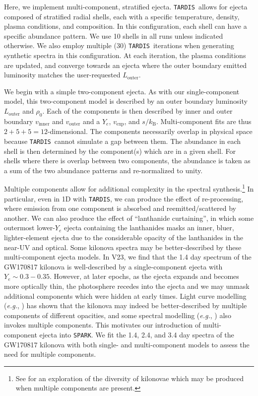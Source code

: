 \documentclass[twocolumn, twocolappendix]{aastex63}
\def\SPARK{\texttt{SPARK}}
\def\TARDIS{\texttt{TARDIS}}
\def\eg{{\it e.g.}}
\begin{document}
Here, we implement multi-component, stratified ejecta. \TARDIS~allows for ejecta composed of stratified radial shells, each with a specific temperature, density, plasma conditions, and composition. In this configuration, each shell can have a specific abundance pattern. We use 10 shells in all runs unless indicated otherwise. We also employ multiple (30) \TARDIS~iterations when generating synthetic spectra in this configuration. At each iteration, the plasma conditions are updated, and converge towards an ejecta where the outer boundary emitted luminosity matches the user-requested $L_{\mathrm{outer}}$. 
    
We begin with a simple two-component ejecta. As with our single-component model, this two-component model is described by an outer boundary luminosity $L_{\mathrm{outer}}$ and $\rho_0$. Each of the components is then described by inner and outer boundary $v_{\mathrm{inner}}$ and $v_{\mathrm{outer}}$ and a $Y_e$, $v_{\mathrm{exp}}$, and $s / k_{\mathrm{B}}$. Multi-component fits are thus $2 + 5 + 5 = 12$-dimensional. The components necessarily overlap in physical space because \TARDIS~cannot simulate a gap between them. The abundance in each shell is then determined by the component(s) which are in a given shell. For shells where there is overlap between two components, the abundance is taken as a sum of the two abundance patterns and re-normalized to unity. %
    
Multiple components allow for additional complexity in the spectral synthesis.\footnote{See \cite{kawaguchi20} for an exploration of the diversity of kilonovae which may be produced when multiple components are present.} In particular, even in 1D with \TARDIS, we can produce the effect of re-processing, where emission from one component is absorbed and reemitted/scattered by another. We can also produce the effect of ``lanthanide curtaining'', in which some outermost lower-$Y_e$ ejecta containing the lanthanides masks an inner, bluer, lighter-element ejecta due to the considerable opacity of the lanthanides in the near-UV and optical. Some kilonova spectra may be better-described by these multi-component ejecta models. In V23, we find that the 1.4 day spectrum of the GW170817 kilonova is well-described by a single-component ejecta with $Y_e \sim 0.3-0.35$. However, at later epochs, as the ejecta expands and becomes more optically thin, the photosphere recedes into the ejecta and we may unmask additional components which were hidden at early times. Light curve modelling (\eg, \citealt{villar17}) has shown that the kilonova may indeed be better-described by multiple components of different opacities, and some spectral modelling (\eg, \citealt{kasen17}) also invokes multiple components. This motivates our introduction of multi-component ejecta into \SPARK. We fit the 1.4, 2.4, and 3.4 day spectra of the GW170817 kilonova with both single- and multi-component models to assess the need for multiple components.
\end{document}
